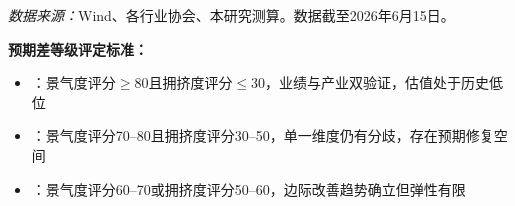 \begin{table}[htbp]
  \vspace{0.3em}
  \caption{七大预期差板块核心指标横向对比}
  \label{tab:seven_surprise_sectors}
  \vspace{-0.5em}
  \begin{flushleft}
  \footnotesize\textit{数据来源：}Wind、各行业协会、本研究测算。数据截至2026年6月15日。
  \end{flushleft}
  \vspace{0.3em}
  \begin{tcolorbox}[colback=gray!5, colframe=gray!30, boxrule=0.5pt,
      left=6pt, right=6pt, top=4pt, bottom=4pt]
    \textbf{\scriptsize 预期差等级评定标准：}
    \scriptsize
    \begin{itemize}[leftmargin=*, itemsep=0pt, parsep=0pt]
      \item[\textcolor{red}{$\bigstar\bigstar\bigstar$ 强预期差}]：景气度评分$\geq$80且拥挤度评分$\leq$30，业绩与产业双验证，估值处于历史低位
      \item[\textcolor{orange}{$\bigstar\bigstar$ 中预期差}]：景气度评分70--80且拥挤度评分30--50，单一维度仍有分歧，存在预期修复空间
      \item[\textcolor{teal}{$\bigstar$ 弱预期差}]：景气度评分60--70或拥挤度评分50--60，边际改善趋势确立但弹性有限
    \end{itemize}
  \end{tcolorbox}
\end{table}
